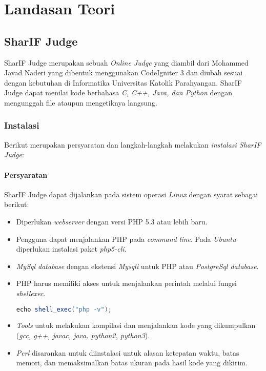\chapter{Landasan Teori}
\label{chap:teori}

\section{SharIF Judge}
\label{sec:judge}

SharIF Judge merupakan sebuah \textit{Online Judge} yang diambil dari Mohammed Javad Naderi yang dibentuk menggunakan CodeIgniter 3 dan diubah sesuai dengan kebutuhan di Informatika Universitas Katolik Parahyangan. SharIF Judge dapat menilai kode berbahasa \textit{C, C++, Java, dan Python} dengan mengunggah file ataupun mengetiknya langsung.

\subsection{Instalasi}

Berikut merupakan persyaratan dan langkah-langkah melakukan \textit{instalasi SharIF Judge}:

\subsubsection{Persyaratan}
SharIF Judge dapat dijalankan pada sistem operasi \textit{Linux} dengan syarat sebagai berikut:
\begin{itemize}
\item Diperlukan \textit{webserver} dengan versi PHP 5.3 atau lebih baru.
\item Pengguna dapat menjalankan PHP pada \textit{command line}. Pada \textit{Ubuntu} diperlukan instalasi paket \textit{php5-cli}.
\item \textit{MySql database} dengan ekstensi \textit{Mysqli} untuk PHP atau \textit{PostgreSql database}.
\item PHP harus memiliki akses untuk menjalankan perintah melalui fungsi \textit{shell\textunderscore exec}.

\begin{lstlisting}[language=Java, caption=Kode untuk melakukah pengetesan fungsi \textit{shell_exec}, label=kode:shell]
	echo shell_exec("php -v");
\end{lstlisting}

\item \textit{Tools} untuk melakukan kompilasi dan menjalankan kode yang dikumpulkan (\textit{gcc, g++, javac, java, python2, python3}).
\item \textit{Perl} disarankan untuk diinstalasi untuk alasan ketepatan waktu, batas memori, dan memaksimalkan batas ukuran pada hasil kode yang dikirim.
\end{itemize}

